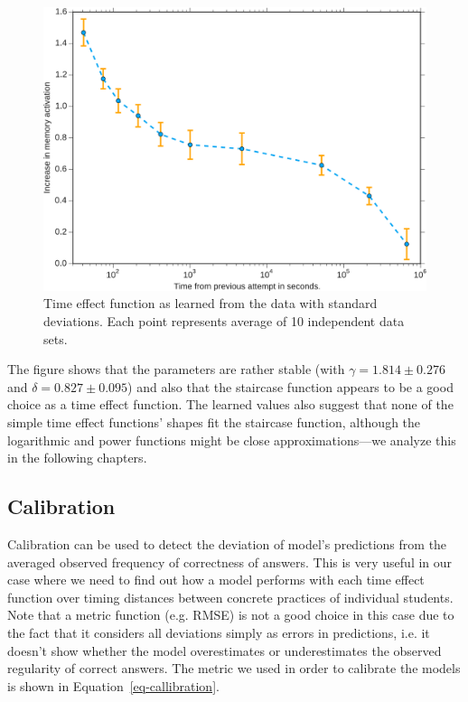 \begin{figure}[htbp]
  \centering
  \includegraphics[width=\textwidth]{img/learned-time-effect-function}
  \caption{Time effect function as learned from the data with standard deviations. Each point represents average of 10 independent data sets.}
  \label{fig:learned-time-effect-function}
\end{figure}

The figure shows that the parameters are rather stable (with $\gamma = 1.814 \pm 0.276$ and $\delta = 0.827 \pm 0.095$) and also that the staircase function appears to be a good choice as a time effect function. The learned values also suggest that none of the simple time effect functions' shapes fit the staircase function, although the logarithmic and power functions might be close approximations---we analyze this in the following chapters.

\subsection{Calibration}
\label{memory-calibration}

Calibration can be used to detect the deviation of model's predictions from the averaged observed frequency of correctness of answers. This is very useful in our case where we need to find out how a model performs with each time effect function over timing distances between concrete practices of individual students. Note that a metric function (e.g. RMSE) is not a good choice in this case due to the fact that it considers all deviations simply as errors in predictions, i.e. it doesn't show whether the model overestimates or underestimates the observed regularity of correct answers. The metric we used in order to calibrate the models is shown in Equation~\ref{eq-callibration}.

